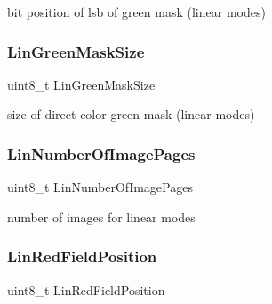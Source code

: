 bit position of lsb of green mask (linear modes) 

\hypertarget{structvbe__mode__info__t_af235e505028771ab2fb84778f4dfb476}{}\label{structvbe__mode__info__t_af235e505028771ab2fb84778f4dfb476} 
\subsubsection{\texorpdfstring{Lin\+Green\+Mask\+Size}{LinGreenMaskSize}}
{\footnotesize\ttfamily uint8\+\_\+t Lin\+Green\+Mask\+Size}



size of direct color green mask (linear modes) 

\hypertarget{structvbe__mode__info__t_a3fa2352e69836f4b69b3a344ae761ba8}{}\label{structvbe__mode__info__t_a3fa2352e69836f4b69b3a344ae761ba8} 
\subsubsection{\texorpdfstring{Lin\+Number\+Of\+Image\+Pages}{LinNumberOfImagePages}}
{\footnotesize\ttfamily uint8\+\_\+t Lin\+Number\+Of\+Image\+Pages}



number of images for linear modes 

\hypertarget{structvbe__mode__info__t_aff962b58f86a77f12b412d47125a4993}{}\label{structvbe__mode__info__t_aff962b58f86a77f12b412d47125a4993} 
\subsubsection{\texorpdfstring{Lin\+Red\+Field\+Position}{LinRedFieldPosition}}
{\footnotesize\ttfamily uint8\+\_\+t Lin\+Red\+Field\+Position}



